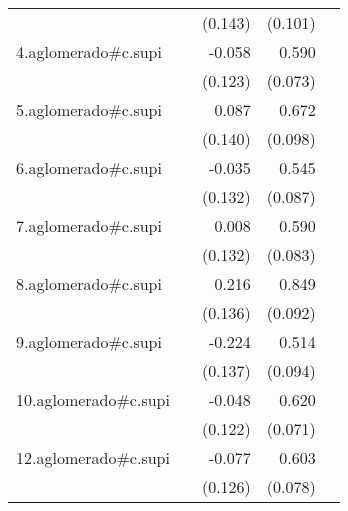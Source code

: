{\begin{longtable}{l*{4}{D{.}{.}{-1}}}
            &                     &     (0.143)         &     (0.101)         &                     \\
\addlinespace
4.aglomerado#c.supi&                     &      -0.058         &       0.590\sym{***}&                     \\
            &                     &     (0.123)         &     (0.073)         &                     \\
\addlinespace
5.aglomerado#c.supi&                     &       0.087         &       0.672\sym{***}&                     \\
            &                     &     (0.140)         &     (0.098)         &                     \\
\addlinespace
6.aglomerado#c.supi&                     &      -0.035         &       0.545\sym{***}&                     \\
            &                     &     (0.132)         &     (0.087)         &                     \\
\addlinespace
7.aglomerado#c.supi&                     &       0.008         &       0.590\sym{***}&                     \\
            &                     &     (0.132)         &     (0.083)         &                     \\
\addlinespace
8.aglomerado#c.supi&                     &       0.216         &       0.849\sym{***}&                     \\
            &                     &     (0.136)         &     (0.092)         &                     \\
\addlinespace
9.aglomerado#c.supi&                     &      -0.224         &       0.514\sym{***}&                     \\
            &                     &     (0.137)         &     (0.094)         &                     \\
\addlinespace
10.aglomerado#c.supi&                     &      -0.048         &       0.620\sym{***}&                     \\
            &                     &     (0.122)         &     (0.071)         &                     \\
\addlinespace
12.aglomerado#c.supi&                     &      -0.077         &       0.603\sym{***}&                     \\
            &                     &     (0.126)         &     (0.078)         &                     \\

\end{longtable}}
